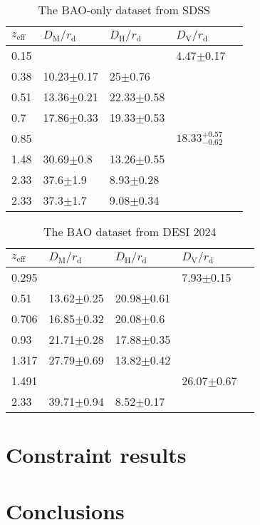 \documentclass{aa}
\begin{document}
   \begin{table}[htbp]
      \caption{The BAO-only dataset from SDSS}
      \centering
      \begin{tabular}{lllll}
         \hline\hline
            $z_{\text{eff}}$ & $D_{\text{M}}/r_{\text{d}}$ & $D_{\text{H}}/r_{\text{d}}$ & $D_{\text{V}}/r_{\text{d}}$ \\
            \hline
            0.15 & & & 4.47$\pm$0.17 \\
            0.38 & 10.23$\pm$0.17 & 25$\pm$0.76 & \\
            0.51 & 13.36$\pm$0.21 & 22.33$\pm$0.58 & \\
            0.7 & 17.86$\pm$0.33 & 19.33$\pm$0.53 & \\
            0.85 & & & $18.33_{-0.62}^{+0.57}$ \\
            1.48 & 30.69$\pm$0.8 & 13.26$\pm$0.55 & \\
            2.33 & 37.6$\pm$1.9 & 8.93$\pm$0.28 & \\
            2.33 & 37.3$\pm$1.7 & 9.08$\pm$0.34 & \\
            \hline
      \end{tabular}
      \label{tab:2}
   \end{table}

   \begin{table}[htbp]
      \caption{The BAO dataset from DESI 2024}
      \centering
      \begin{tabular}{lllll}
         \hline\hline
            $z_{\text{eff}}$ & $D_{\text{M}}/r_{\text{d}}$ & $D_{\text{H}}/r_{\text{d}}$ & $D_{\text{V}}/r_{\text{d}}$ \\
            \hline
            0.295 & & & 7.93$\pm$0.15 \\
            0.51 & 13.62$\pm$0.25 & 20.98$\pm$0.61 & \\
            0.706 & 16.85$\pm$0.32 & 20.08$\pm$0.6 & \\
            0.93 & 21.71$\pm$0.28 & 17.88$\pm$0.35 & \\
            1.317 & 27.79$\pm$0.69 & 13.82$\pm$0.42 & \\
            1.491 & & & 26.07$\pm$0.67 \\
            2.33 & 39.71$\pm$0.94 & 8.52$\pm$0.17 & \\
            \hline
      \end{tabular}
      \label{tab:3}
   \end{table}

\section{Constraint results}

\section{Conclusions}



\end{document}
